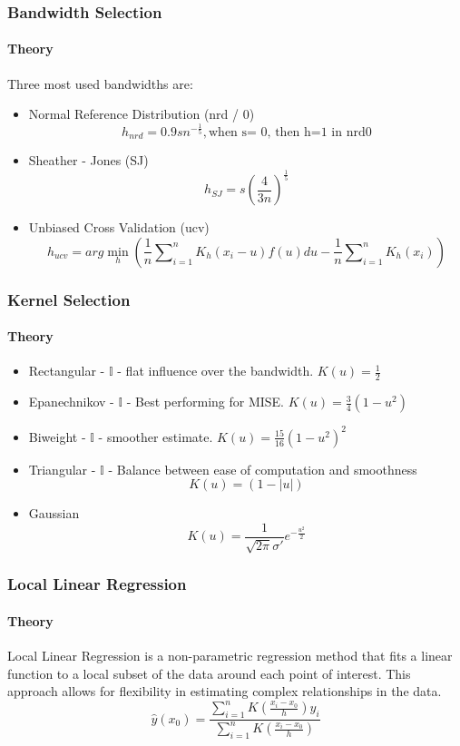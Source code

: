 \documentclass{beamer} %
\theoremstyle{definition}
\begin{document}
	\begin{frame}
		\frametitle{Bandwidth Selection}
		\framesubtitle{Theory}
		Three most used bandwidths are:
		\begin{itemize}
			\item Normal Reference Distribution (nrd / 0) $$ h_{nrd} = 0.9 sn^{-\frac{1}{5}}, \text{when s= 0, then h=1 in nrd0}$$
			\item Sheather - Jones (SJ) $$ h_{SJ} = s \left( \frac{4}{3n} \right)^{\frac{1}{5}} $$
			\item Unbiased Cross Validation (ucv) $$ h_{ucv} = arg \min_h \left( \frac{1}{n} \sum\nolimits_{i=1}^{n} K_h (x_i - u) f(u) du - \frac{1}{n} \sum\nolimits_{i=1}^{n} K_h (x_i) \right) $$
		\end{itemize}
		
	\end{frame}
	
	
	\begin{frame}
		\frametitle{Kernel Selection}
		\framesubtitle{Theory}
		   \begin{itemize}
			\item Rectangular - $\mathbb{I}$ - flat influence over the bandwidth.
			$ K(u) = \frac{1}{2} $
			 			
			\item Epanechnikov - $\mathbb{I}$ - Best performing for MISE. \quad $ K(u) = \frac{3}{4}(1 - u^2)$
		
			\item Biweight - $\mathbb{I}$ - smoother estimate. \quad 
			$ K(u) = \frac{15}{16}(1 - u^2)^2 $
			
			\item Triangular - $\mathbb{I}$ - Balance between ease of computation and smoothness
			$$ K(u) = (1 - |u|) $$
			
			\item Gaussian 	$$ K(u) = \frac{1}{\sqrt{2\pi}\sigma'} e^{-\frac{u^2}{2}} $$
		\end{itemize}
	\end{frame}
	
	\begin{frame}
		\frametitle{Local Linear Regression}
		\framesubtitle{Theory}
		Local Linear Regression is a non-parametric regression method that fits a linear function to a local subset of the data around each point of interest. This approach allows for flexibility in estimating complex relationships in the data.
		$$
		\hat{y}(x_0) = \frac{\sum_{i=1}^{n} K\left(\frac{x_i - x_0}{h}\right) y_i}{\sum_{i=1}^{n} K\left(\frac{x_i - x_0}{h}\right)}
		$$
	\end{frame}
	
\end{document}
